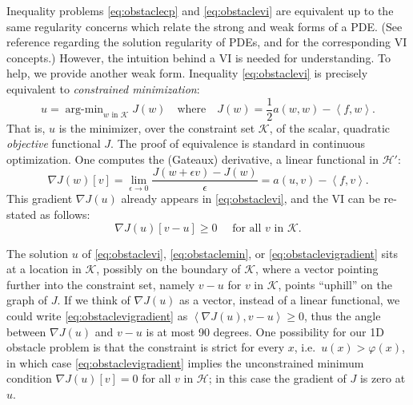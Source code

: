 \documentclass[letterpaper,final,12pt,reqno]{amsart}
\newcommand{\eps}{\epsilon}
\newcommand{\grad}{\nabla}
\newcommand{\ip}[2]{\left<#1,#2\right>}
\numberwithin{equation}{section}
\numberwithin{figure}{section}
\numberwithin{table}{section}
\begin{document}
Inequality problems \eqref{eq:obstaclecp} and \eqref{eq:obstaclevi} are equivalent up to the same regularity concerns which relate the strong and weak forms of a PDE.  (See reference \cite{Evans2010} regarding the solution regularity of PDEs, and \cite{KinderlehrerStampacchia1980} for the corresponding VI concepts.)  However, the intuition behind a VI is needed for understanding.  To help, we provide another weak form.  Inequality \eqref{eq:obstaclevi} is precisely equivalent to \emph{constrained minimization}:
\newcommand{\argmin}{\mathop{\mathrm{arg\text{-}min}}}
\begin{equation}
  u = \argmin_{w \text{ in } \mathcal{K}} J(w) \quad \text{where} \quad J(w) = \frac{1}{2} a(w,w) - \ip{f}{w}. \label{eq:obstaclemin}
\end{equation}
That is, $u$ is the minimizer, over the constraint set $\mathcal{K}$, of the scalar, quadratic \emph{objective} functional $J$.  The proof of equivalence is standard in continuous optimization.  One computes the (Gateaux) derivative, a linear functional in $\mathcal{H}'$:
\begin{equation}
  \grad J(w)[v] = \lim_{\eps\to 0} \frac{J(w+\eps v) - J(w)}{\eps} = a(u,v) - \ip{f}{v}.  \label{eq:gradobjective}
\end{equation}
This gradient $\nabla J(u)$ already appears in \eqref{eq:obstaclevi}, and the VI can be re-stated as follows:
\begin{equation}
  \nabla J(u)[v-u] \ge 0 \quad \text{ for all } v \text{ in } \mathcal{K}. \label{eq:obstaclevigradient}
\end{equation}

The solution $u$ of \eqref{eq:obstaclevi}, \eqref{eq:obstaclemin}, or \eqref{eq:obstaclevigradient} sits at a location in $\mathcal{K}$, possibly on the boundary of $\mathcal{K}$, where a vector pointing further into the constraint set, namely $v-u$ for $v$ in $\mathcal{K}$, points ``uphill'' on the graph of $J$.  If we think of $\nabla J(u)$ as a vector, instead of a linear functional, we could write \eqref{eq:obstaclevigradient} as $\ip{\nabla J(u)}{v-u} \ge 0$, thus the angle between $\nabla J(u)$ and $v-u$ is at most 90 degrees.  One possibility for our 1D obstacle problem is that the constraint is strict for every $x$, i.e.~$u(x) > \varphi(x)$, in which case \eqref{eq:obstaclevigradient} implies the unconstrained minimum condition $\nabla J(u)[v] = 0$ for all $v$ in $\mathcal{H}$; in this case the gradient of $J$ is zero at $u$.
\end{document}
